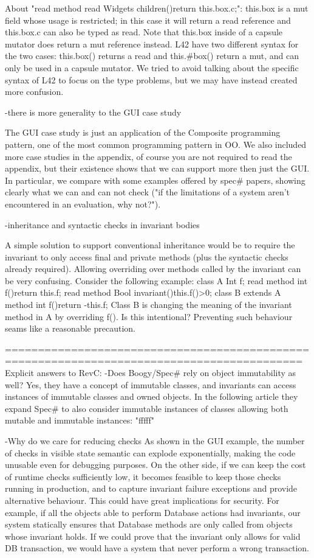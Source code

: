 About "read method read Widgets children(){return this.box.c;}":
this.box is a mut field
whose usage is restricted; in this case it will return a read reference and this.box.c can
also be typed as read.
Note that this.box inside of a capsule mutator does return a mut reference instead.
L42 have two different syntax for the two cases: this.box() returns a read
and this.#box() return a mut, and can only be used in a capsule mutator.
We tried to avoid talking about the specific syntax of L42 to focus on the type problems,
but we may have instead created more confusion.


-there is more generality to the GUI case study

The GUI case study is just an application of the Composite programming pattern,
one of the most common programming pattern in OO.
We also included more case studies in the appendix, of course you are not required
to read the appendix, but their existence shows that we can support more then just the GUI.
 In particular, we compare with some examples offered by spec# papers, showing clearly what
 we can and can not check ("if the limitations of a system aren't encountered in an evaluation, why not?").


-inheritance and syntactic checks in invariant bodies

A simple solution to support conventional inheritance would be to require the invariant to only
access final and private methods (plus the syntactic checks already required).
Allowing overriding over methods called by the invariant can be very confusing.
Consider the following example:
class A{
 Int f;
 read method int f(){return this.f;}
 read method Bool invariant(){this.f()>0;}
 }
class B extends A {
  method int f(){return -this.f;}
  }
Class B is changing the meaning of the invariant method in A by overriding f().
Is this intentional? Preventing such behaviour seams like a reasonable precaution.

===========================================================================================
Explicit answers to RevC:
-Does Boogy/Spec# rely on object immutability as well?
Yes, they have a concept of immutable classes, and invariants can access instances of
immutable classes and owned objects. In the following article they expand Spec# to also
consider immutable instances of classes allowing both mutable and immutable instances: "fffff"

-Why do we care for reducing checks
As shown in the GUI example, the number of checks in visible state semantic can explode
exponentially, making the code unusable even for debugging purposes.
On the other side, if we can keep the cost of runtime checks sufficiently low,
it becomes feasible to keep those checks running in production,
and to capture invariant failure exceptions and provide alternative behaviour.
This could have great implications for security.
For example, if all the objects able to perform Database actions had invariants,
our system statically ensures that Database methods are only called from objects whose invariant holds.
If we could prove that the invariant only allows for valid DB transaction, we would have a system
that never perform a wrong transaction.

